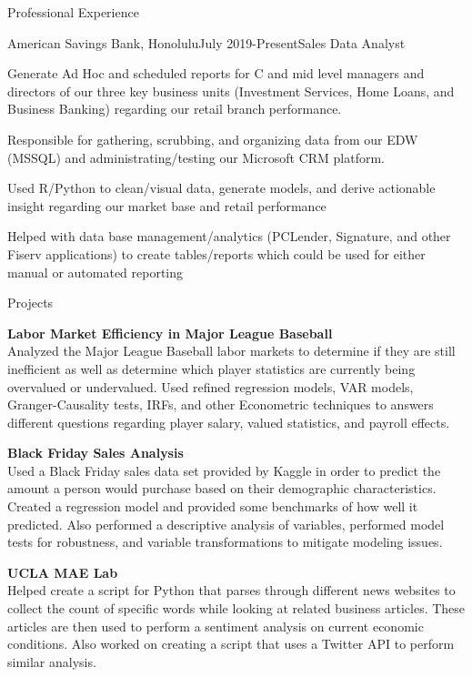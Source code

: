 \documentclass{resume} %
\begin{document}
\begin{rSection}{Professional Experience}

\begin{rSubsection}{American Savings Bank, Honolulu}{July 2019-Present}{Sales Data Analyst}{}
\item Generate Ad Hoc and scheduled reports for C and mid level managers and directors of our three key business units (Investment Services, Home Loans, and Business Banking) regarding our retail branch performance.
\item Responsible for gathering, scrubbing, and organizing data from our EDW (MSSQL) and administrating/testing our Microsoft CRM platform.
\item Used R/Python to clean/visual data, generate models, and derive actionable insight regarding our market base and retail performance
\item Helped with data base management/analytics (PCLender, Signature, and other Fiserv applications) to create tables/reports which could be used for either manual or automated reporting
\end{rSubsection}

\end{rSection}
\begin{rSection}{Projects}

{\bf Labor Market Efficiency in Major League Baseball}\\
Analyzed the Major League Baseball labor markets to determine if they are still inefficient as well as determine which player statistics are currently being overvalued or undervalued. Used refined regression models, VAR models, Granger-Causality tests, IRFs, and other Econometric techniques  to answers different questions regarding player salary, valued statistics, and payroll effects. 

{\bf Black Friday Sales Analysis}\\
 Used a Black Friday sales data set provided by Kaggle in order to predict the amount a person would purchase based on their demographic characteristics. Created a regression model and provided some benchmarks of how well it predicted. Also performed a descriptive analysis of variables, performed model tests for robustness, and variable transformations to mitigate modeling issues. 

{\bf UCLA MAE Lab}\\
 Helped create a script for Python that parses through different news websites to collect the count of specific words while looking at related business articles. These articles are then used to perform a sentiment analysis on current economic conditions. Also worked on creating a script that uses a Twitter API to perform similar analysis.

\end{rSection}
\end{document}
